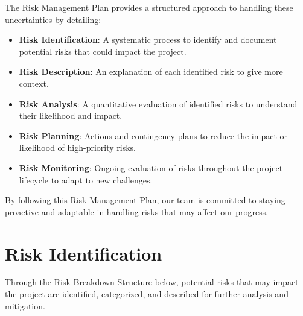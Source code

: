 \documentclass{article}
\begin{document}
The Risk Management Plan provides a structured approach to handling these uncertainties by detailing:
\begin{itemize}
    \item \textbf{Risk Identification}: A systematic process to identify and document potential risks that could impact the project.
    \item \textbf{Risk Description}: An explanation of each identified risk to give more context.
    \item \textbf{Risk Analysis}: A quantitative evaluation of identified risks to understand their likelihood and impact.
    \item \textbf{Risk Planning}: Actions and contingency plans to reduce the impact or likelihood of high-priority risks.
    \item \textbf{Risk Monitoring}: Ongoing evaluation of risks throughout the project lifecycle to adapt to new challenges.
\end{itemize}

\tableofcontents

By following this Risk Management Plan, our team is committed to staying proactive and adaptable in handling risks that may affect our progress.
\pagebreak


\section{Risk Identification}

Through the Risk Breakdown Structure below, potential risks that may impact the project are identified, categorized, and described for further analysis and mitigation.
\end{document}
